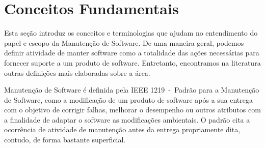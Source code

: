 %
%
%
%
\section{Conceitos Fundamentais}
\label{sec:conceitos_basicos}

Esta seção introduz os conceitos e terminologias que ajudam no entendimento do
papel e escopo da Manutenção de Software. De uma maneira geral, podemos definir
atividade de manter software como a totalidade das ações necessárias para
fornecer suporte a um produto de software. Entretanto, encontramos na literatura
outras definições mais elaboradas sobre a área.

Manutenção de Software é definida pela IEEE 1219~\cite{ISO-1219-1998}-~Padrão para a
Manutenção de Software, como a modificação de um produto de software após a sua
entrega com o objetivo de corrigir falhas, melhorar o desempenho ou outros
atributos com a finalidade de adaptar o software as modificações ambientais. O
padrão cita a ocorrência de atividade de manutenção antes da entrega
propriamente dita, contudo, de forma bastante superficial.

